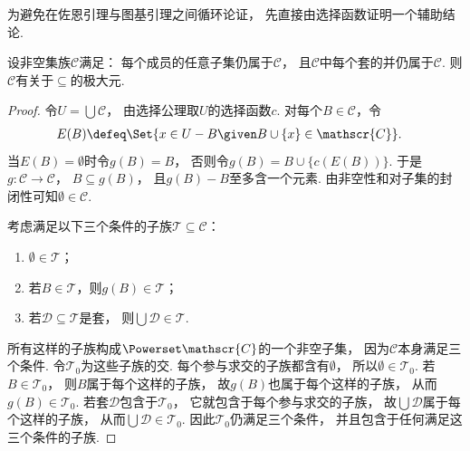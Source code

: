 为避免在佐恩引理与图基引理之间循环论证，
先直接由选择函数证明一个辅助结论.
\begin{lemma}\label{lemma:无穷直积.单点扩张极大元}
    设非空集族\(\mathscr{C}\)满足：
    每个成员的任意子集仍属于\(\mathscr{C}\)，
    且\(\mathscr{C}\)中每个套的并仍属于\(\mathscr{C}\).
    则\(\mathscr{C}\)有关于\(\subseteq\)的极大元.
    \begin{proof}
        令\(U=\bigcup\mathscr{C}\)，
        由选择公理取\(U\)的选择函数\(c\).
        对每个\(B\in\mathscr{C}\)，令
        \begin{align*}
            E(B)&\defeq\Set{x\in U-B\given B\cup\{x\}\in\mathscr{C}}.
        \end{align*}
        当\(E(B)=\emptyset\)时令\(g(B)=B\)，
        否则令\(g(B)=B\cup\{c(E(B))\}\).
        于是\(g\colon\mathscr{C}\to\mathscr{C}\)，
        \(B\subseteq g(B)\)，
        且\(g(B)-B\)至多含一个元素.
        由非空性和对子集的封闭性可知\(\emptyset\in\mathscr{C}\).

        考虑满足以下三个条件的子族\(\mathscr{T}\subseteq\mathscr{C}\)：
        \begin{enumerate}
            \item \(\emptyset\in\mathscr{T}\)；
            \item 若\(B\in\mathscr{T}\)，则\(g(B)\in\mathscr{T}\)；
            \item 若\(\mathscr{D}\subseteq\mathscr{T}\)是套，
            则\(\bigcup\mathscr{D}\in\mathscr{T}\).
        \end{enumerate}
        所有这样的子族构成\(\Powerset\mathscr{C}\)的一个非空子集，
        因为\(\mathscr{C}\)本身满足三个条件.
        令\(\mathscr{T}_0\)为这些子族的交.
        每个参与求交的子族都含有\(\emptyset\)，
        所以\(\emptyset\in\mathscr{T}_0\).
        若\(B\in\mathscr{T}_0\)，
        则\(B\)属于每个这样的子族，
        故\(g(B)\)也属于每个这样的子族，
        从而\(g(B)\in\mathscr{T}_0\).
        若套\(\mathscr{D}\)包含于\(\mathscr{T}_0\)，
        它就包含于每个参与求交的子族，
        故\(\bigcup\mathscr{D}\)属于每个这样的子族，
        从而\(\bigcup\mathscr{D}\in\mathscr{T}_0\).
        因此\(\mathscr{T}_0\)仍满足三个条件，
        并且包含于任何满足这三个条件的子族.


\end{proof}
\end{lemma}
